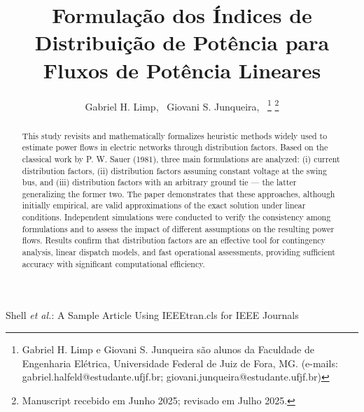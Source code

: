 \documentclass[journal]{IEEEtran}
\begin{document}
\title{Formulação dos Índices de Distribuição de Potência para Fluxos de Potência Lineares }

\author{Gabriel H. Limp,~
        Giovani S. Junqueira,~%
        \thanks{Gabriel H. Limp e Giovani S. Junqueira são alunos da Faculdade de Engenharia El\'etrica, Universidade Federal de Juiz de Fora, MG. (e-mails: gabriel.halfeld@estudante.ufjf.br; giovani.junqueira@estudante.ufjf.br)}%
        \thanks{Manuscript recebido em Junho 2025; revisado em Julho 2025.}
}

%
{Shell \MakeLowercase{\textit{et al.}}: A Sample Article Using IEEEtran.cls for IEEE Journals}


\maketitle

\begin{abstract}
This study revisits and mathematically formalizes heuristic methods widely used to estimate power flows in electric networks through distribution factors. Based on the classical work by P. W. Sauer (1981), three main formulations are analyzed: (i) current distribution factors, (ii) distribution factors assuming constant voltage at the swing bus, and (iii) distribution factors with an arbitrary ground tie — the latter generalizing the former two. The paper demonstrates that these approaches, although initially empirical, are valid approximations of the exact solution under linear conditions. Independent simulations were conducted to verify the consistency among formulations and to assess the impact of different assumptions on the resulting power flows. Results confirm that distribution factors are an effective tool for contingency analysis, linear dispatch models, and fast operational assessments, providing sufficient accuracy with significant computational efficiency. 
\end{abstract}
\end{document}
